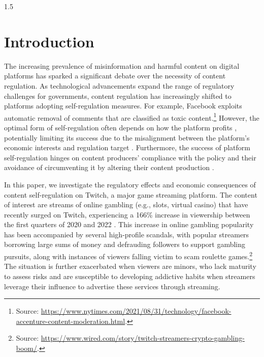 \documentclass[a4paper,12pt]{article}
\begin{document}
\begin{spacing}{1.5}
\section{Introduction}\label{section-introduction}
The increasing prevalence of misinformation \citep[e.g.][]{beck2023guardians,gandhi2023misinformation,ananthakrishnan2020tangled} and harmful content \citep[e.g.][]{beknazar2022toxic,aridor2024economics} on digital platforms has sparked a significant debate over the necessity of content regulation. As technological advancements expand the range of regulatory challenges for governments, content regulation has increasingly shifted to platforms adopting self-regulation measures. For example, Facebook exploits automatic removal of comments that are classified as toxic content.\footnote{Source: \url{https://www.nytimes.com/2021/08/31/technology/facebook-accenture-content-moderation.html}.} However, the optimal form of self-regulation often depends on how the platform profits \citep{liu2022implications}, potentially limiting its success due to the misalignment between the platform's economic interests and regulation target \citep{cusumano2021can}. Furthermore, the success of platform self-regulation hinges on content producers’ compliance with the policy and their avoidance of circumventing it by altering their content production \citep{aridor2024economics}. %

In this paper, we investigate the regulatory effects and economic consequences of content self-regulation on Twitch, a major game streaming platform. The content of interest are streams of online gambling (e.g., slots, virtual casino) that have recently surged on Twitch, experiencing a 166\% increase in viewership between the first quarters of 2020 and 2022 \citep{Streamscheme,Streamhatchetb}. This increase in online gambling popularity has been accompanied by several high-profile scandals, with popular streamers borrowing large sums of money and defrauding followers to support gambling pursuits, along with instances of viewers falling victim to scam roulette games.\footnote{Source: \url{https://www.wired.com/story/twitch-streamers-crypto-gambling-boom/}.} The situation is further exacerbated when viewers are minors, who lack maturity to assess risks and are susceptible to developing addictive habits when streamers leverage their influence to advertise these services through streaming.


\end{spacing}
\end{document}
